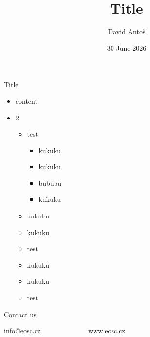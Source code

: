 \documentclass[aspectratio=169]{beamer}
\begin{document}
\title{Title}
\author[D.A.]{David Antoš}
\date{30 June 2026}

\begin{frame}[plain]
  \maketitle
\end{frame}

\begin{frame}{Title}
  \begin{itemize}
    \item content
    \item 2
      \begin{itemize}
        \item test
          \begin{itemize}
            \item kukuku
            \item kukuku
            \item bububu
            \item kukuku
          \end{itemize}
        \item kukuku
        \item kukuku
        \item test
        \item kukuku
        \item kukuku
        \item test
      \end{itemize}
  \end{itemize}
\end{frame}

\begin{lastframe}{}
  \vspace*{.35\textheight}\par %
  Contact us
  \par\null\par
  info@eosc.cz\ \ \ \ \ \ \ \ \ \ \ \ \ \ www.eosc.cz

\end{lastframe}
\end{document}
